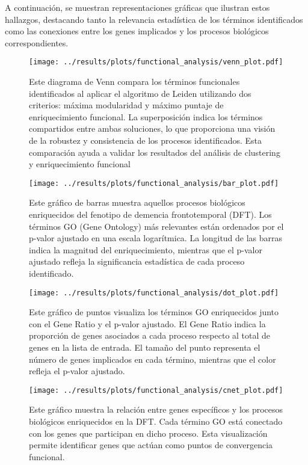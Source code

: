 A continuación, se muestran representaciones gráficas que ilustran estos hallazgos, destacando tanto la relevancia estadística de los términos identificados como las conexiones entre los genes implicados y los procesos biológicos correspondientes.

\begin{figure}[htbp!]
	\centering
	\texttt{[image: ../results/plots/functional\_analysis/venn\_plot.pdf]}
	\caption{Este diagrama de Venn compara los términos funcionales identificados al aplicar el algoritmo de Leiden utilizando dos criterios: máxima modularidad y máximo puntaje de enriquecimiento funcional. La superposición indica los términos compartidos entre ambas soluciones, lo que proporciona una visión de la robustez y consistencia de los procesos identificados. Esta comparación ayuda a validar los resultados del análisis de clustering y enriquecimiento funcional}
	\label{fig:venn_plot}
\end{figure}


\begin{figure}[htbp!]
	\centering
	\texttt{[image: ../results/plots/functional\_analysis/bar\_plot.pdf]}
	\caption{Este gráfico de barras muestra aquellos procesos biológicos enriquecidos del fenotipo de demencia frontotemporal (DFT). Los términos GO (Gene Ontology) más relevantes están ordenados por el p-valor ajustado en una escala logarítmica. La longitud de las barras indica la magnitud del enriquecimiento, mientras que el p-valor ajustado refleja la significancia estadística de cada proceso identificado.}
	\label{fig:bar_plot}
\end{figure}

\begin{figure}[htbp!]
	\centering
	\texttt{[image: ../results/plots/functional\_analysis/dot\_plot.pdf]}
	\caption{Este gráfico de puntos visualiza los términos GO enriquecidos junto con el Gene Ratio y el p-valor ajustado. El Gene Ratio indica la proporción de genes asociados a cada proceso respecto al total de genes en la lista de entrada. El tamaño del punto representa el número de genes implicados en cada término, mientras que el color refleja el p-valor ajustado.}
	\label{fig:dot_plot}
\end{figure}

\begin{figure}[htbp!]
	\centering
	\texttt{[image: ../results/plots/functional\_analysis/cnet\_plot.pdf]}
	\caption{Este gráfico muestra la relación entre genes específicos y los procesos biológicos enriquecidos en la DFT. Cada término GO está conectado con los genes que participan en dicho proceso. Esta visualización permite identificar genes que actúan como puntos de convergencia funcional.}
	\label{fig:cnet_plot}
\end{figure}

\newpage
